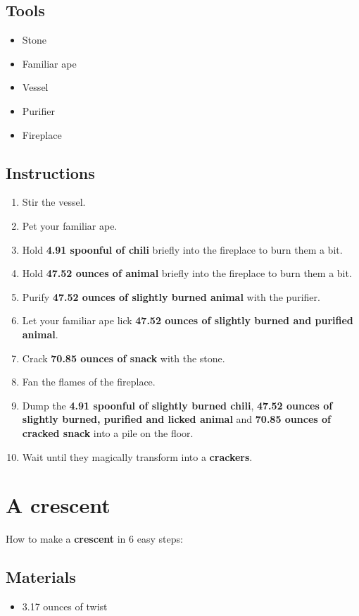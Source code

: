 \documentclass{article}
\begin{document}
\subsection{Tools}\begin{itemize}
\item 
Stone
\item 
Familiar ape
\item 
Vessel
\item 
Purifier
\item 
Fireplace
\end{itemize}
\subsection{Instructions}\begin{enumerate}
\item 
Stir the vessel.
\item 
Pet your familiar ape.
\item 
Hold \textbf{4.91 spoonful of chili} briefly into the fireplace to burn them a bit.
\item 
Hold \textbf{47.52 ounces of animal} briefly into the fireplace to burn them a bit.
\item 
Purify \textbf{47.52 ounces of slightly burned animal} with the purifier.
\item 
Let your familiar ape lick \textbf{47.52 ounces of slightly burned and purified animal}.
\item 
Crack \textbf{70.85 ounces of snack} with the stone.
\item 
Fan the flames of the fireplace.
\item 
Dump the \textbf{4.91 spoonful of slightly burned chili}, \textbf{47.52 ounces of slightly burned, purified and licked animal} and \textbf{70.85 ounces of cracked snack} into a pile on the floor.
\item 
Wait until they magically transform into a \textbf{crackers}.
\end{enumerate}
\newpage
\section{A crescent}How to make a \textbf{crescent} in 6 easy steps:

\subsection{Materials}\begin{itemize}
\item 
3.17 ounces of twist
\end{itemize}
\end{document}
